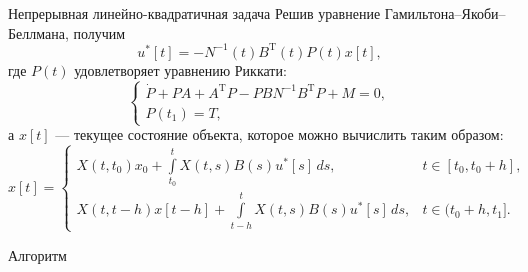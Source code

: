         \begin{frame}{Непрерывная линейно-квадратичная задача}
                Решив уравнение Гамильтона--Якоби--Беллмана, получим
                \begin{equation*}
                        u^*[t] = -N^{-1}(t)B^{\mathrm{T}}(t) P(t)x[t],
                \end{equation*}
                где $P(t)$ удовлетворяет уравнению Риккати:
                \begin{equation*}
                        \begin{cases}
                                \dot P + PA + A^{\mathrm{T}} P - PBN^{-1}B^{\mathrm{T}} P + M = 0,\\
                                P(t_1) = T,
                        \end{cases}
                \end{equation*}
                а $x[t]$ --- текущее состояние объекта, которое можно вычислить таким образом:
                \begin{equation*}
                        x[t] =
                        \begin{cases}
                                X(t,t_0)x_0 + \int\limits_{t_0}^{t}X(t,s)B(s)u^*[s]\,ds,
                                &
                                t \in [t_0,t_0 + h],
                                \\
                                X(t,t - h)x[t-h] + \int\limits_{t - h}^{t}X(t,s)B(s)u^*[s]\,ds,
                                &
                                t \in (t_0 + h,t_1].
                        \end{cases}
                \end{equation*}
        \end{frame}
        \begin{frame}{Алгоритм}
        \end{frame}
